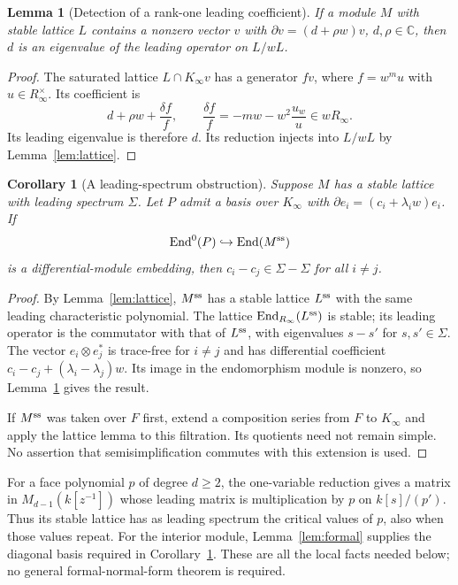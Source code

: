 \documentclass[11pt]{article}
\numberwithin{equation}{section}
\newtheorem{lemma}[theorem]{Lemma}
\newtheorem{corollary}[theorem]{Corollary}
\theoremstyle{definition}
\theoremstyle{remark}
\newcommand{\C}{\mathbb C}\newcommand{\Q}{\mathbb Q}\newcommand{\R}{\mathbb R}\newcommand{\Z}{\mathbb Z}
\newcommand{\End}{\operatorname{End}}\newcommand{\Hom}{\operatorname{Hom}}\newcommand{\Span}{\operatorname{span}}
\begin{document}
\begin{lemma}[Detection of a rank-one leading coefficient]\label{lem:rankone}
If a module $M$ with stable lattice $L$ contains a nonzero vector $v$ with
$\partial v=(d+\rho w)v$, $d,\rho\in\C$, then $d$ is an eigenvalue of the
leading operator on $L/wL$.
\end{lemma}
\begin{proof}
The saturated lattice $L\cap K_\infty v$ has a generator $fv$, where
$f=w^m u$ with $u\in R_\infty^\times$. Its coefficient is
\[
 d+\rho w+\frac{\delta f}{f},\qquad
 \frac{\delta f}{f}=-mw-w^2\frac{u_w}{u}\in wR_\infty.
\]
Its leading eigenvalue is therefore $d$. Its reduction injects into $L/wL$
by Lemma~\ref{lem:lattice}.
\end{proof}

\begin{corollary}[A leading-spectrum obstruction]\label{cor:face-lattice}
Suppose $M$ has a stable lattice with leading spectrum $\Sigma$. Let $P$
admit a basis over $K_\infty$ with
$\partial e_i=(c_i+\lambda_iw)e_i$. If
\[
 \End^0(P)\hookrightarrow\End(M^{\rm ss})
\]
is a differential-module embedding, then $c_i-c_j\in\Sigma-\Sigma$ for
all $i\ne j$.
\end{corollary}
\begin{proof}
By Lemma~\ref{lem:lattice}, $M^{\rm ss}$ has a stable lattice $L^{\rm ss}$
with the same leading characteristic polynomial. The lattice
$\End_{R_\infty}(L^{\rm ss})$ is stable; its leading operator is the
commutator with that of $L^{\rm ss}$, with eigenvalues $s-s'$ for
$s,s'\in\Sigma$. The vector $e_i\otimes e_j^*$ is trace-free for $i\ne j$
and has differential coefficient
$c_i-c_j+(\lambda_i-\lambda_j)w$. Its image in the endomorphism module is
nonzero, so Lemma~\ref{lem:rankone} gives the result.

If $M^{\rm ss}$ was taken over $F$ first, extend a composition series from
$F$ to $K_\infty$ and apply the lattice lemma to this filtration. Its
quotients need not remain simple. No assertion that semisimplification
commutes with this extension is used.
\end{proof}

For a face polynomial $p$ of degree $d\ge2$, the one-variable reduction gives
a matrix in $M_{d-1}(k[z^{-1}])$ whose leading matrix is multiplication by
$p$ on $k[s]/(p')$. Thus its stable lattice has as leading spectrum the
critical values of $p$, also when those values repeat. For the interior
module, Lemma~\ref{lem:formal} supplies the diagonal basis required in
Corollary~\ref{cor:face-lattice}. These are all the local facts needed below;
no general formal-normal-form theorem is required.
\end{document}
